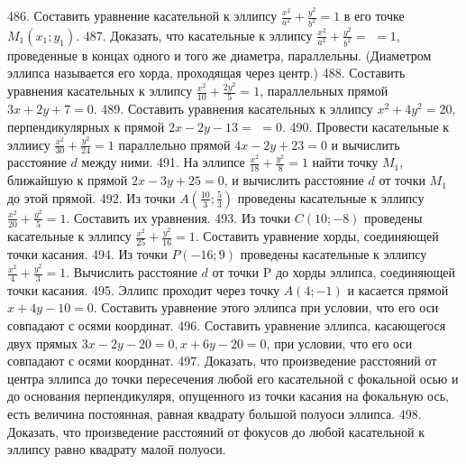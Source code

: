 486. Составить уравнение касательной к эллипсу $\frac{x^2}{a^2}+\frac{y^2}{b^2}=1$ в его точке $M_1\left(x_1 ; y_1\right)$.
487. Доказать, что касательные к эллипсу $\frac{x^2}{a^2}+\frac{y^2}{b^2}=$ $=1$, проведенные в концах одного и того же диаметра, параллельны. (Диаметром эллипса называется его хорда, проходящая через центр.)
488. Составить уравнения касательных к эллипсу $\frac{x^2}{10}+\frac{2 y^2}{5}=1$, параллельных прямой $3 x+2 y+7=0$.
489. Составить уравнения касательных к эллипсу $x^2+4 y^2=20$, перпендикулярных к прямой $2 x-2 y-13=$ $=0$.
490. Провести касательные к эллиису $\frac{x^2}{30}+\frac{y^2}{24}=1$ параллельно прямой $4 x-2 y+23=0$ и вычислить расстояние $d$ между ними.
491. На эллипсе $\frac{x^2}{18}+\frac{y^2}{8}=1$ найти точку $M_1$, ближайшую к прямой $2 x-3 y+25=0$, и вычислить расстояние $d$ от точки $M_1$ до этой прямой.
492. Из точки $A\left(\frac{10}{3} ; \frac{5}{3}\right)$ проведены касательные к эллипсу $\frac{x^2}{20}+\frac{y^2}{5}=1$. Составить их уравнения.
493. Из точки $C(10 ;-8)$ проведены касательные к эллипсу $\frac{x^2}{25}+\frac{y^2}{16}=1$. Составить уравнение хорды, соединяющей точки касания.
494. Из точки $P(-16 ; 9)$ проведены касательные к эллипсу $\frac{x^2}{4}+\frac{y^2}{3}=1$. Вычислить расстояние $d$ от точки P до хорды эллипса, соединяющей точки касания.
495. Эллипс проходит через точку $A(4 ;-1)$ и касается прямой $x+4 y-10=0$. Составить уравнение этого эллипса при условии, что его оси совпадают с осями координат.
496. Составить уравнение эллипса, касающегося двух прямых $3 x-2 y-20=0, x+6 y-20=0$, при условии, что его оси совпадают с осями коордннат.
497. Доказать, что произведение расстояний от центра эллипса до точки пересечения любой его касательной с фокальной осью и до основания перпендикуляря, опущенного из точки касания на фокальную ось, есть величина постоянная, равная квадрату большой полуоси эллипса.
498. Доказать, что произведение расстояний от фокусов до любой касательной к эллипсу равно квадрату малой полуоси.
